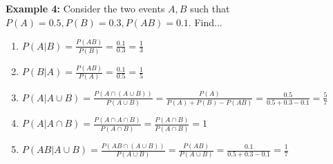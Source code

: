 \documentclass[12pt]{article}
\begin{document}
\textbf{Example 4:} Consider the two events $A,B$ such that\\
$P(A) = 0.5, P(B) = 0.3, P(AB) = 0.1$. Find...
\begin{enumerate}
	\item{$P(A|B) = \frac{P(AB)}{P(B)} = \frac{0.1}{0.3} = \frac{1}{3}$}
	\item{$P(B|A) = \frac{P(AB)}{P(A)} = \frac{0.1}{0.5} = \frac{1}{5}$}
	\item{$P(A|A\cup B) = \frac{P(A\cap(A\cup B))}{P(A \cup B)} = \frac{P(A)}{P(A)+P(B)-P(AB)} = \frac{0.5}{0.5+0.3-0.1} = \frac{5}{7}$}
	\item{$P(A|A\cap B) = \frac{P(A\cap A\cap B)}{P(A\cap B)} = \frac{P(A\cap B)}{P(A\cap B)} =1$}
	\item{$P(AB | A\cup B) = \frac{P(AB \cap (A\cup B))}{P(A \cup B)} = \frac{P(AB)}{P(A\cup B)} = \frac{0.1}{0.5+0.3-0.1} = \frac{1}{7}$}
\end{enumerate}
\end{document}
